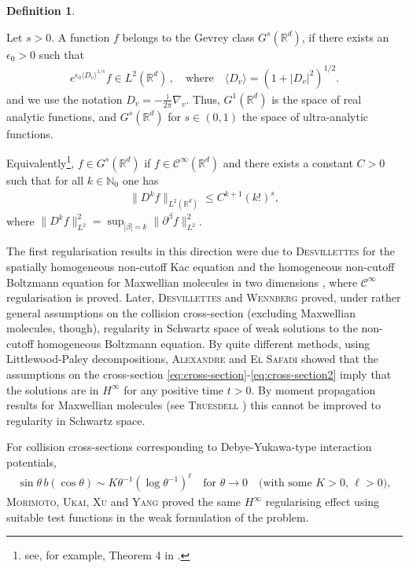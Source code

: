 \documentclass[11pt,a4paper,reqno]{amsart}
\theoremstyle{plain}
\theoremstyle{definition}
\newtheorem{definition}[proposition]{Definition}
\begin{document}
\begin{definition}\label{def:Gevrey}

	Let $s>0$. A function $f$ belongs to the Gevrey class $G^s({\mathbb{R}}^d)$, 	
	if there exists an $\epsilon_0>0$ such that
	\begin{align*}
		e^{\epsilon_0 \langle D_v \rangle^{1/s}} f \in L^2({\mathbb{R}}^d)\,, \quad  \text{where} \quad \langle D_v \rangle = \left(1+ |D_v|^2 \right)^{1/2}.
	\end{align*}
	and we use the notation $D_v=-\frac{\mathrm{i}}{2\pi} \nabla_v$. Thus, $G^1({\mathbb{R}}^d)$ is the space of real analytic functions, and $G^s({\mathbb{R}}^d)$ for $s\in(0,1)$ the space of ultra-analytic functions.
	
	Equivalently\footnote{see, for example, Theorem 4 in \cite{LO97}.}, $f\in G^s({\mathbb{R}}^d)$ if
	$f\in \mathcal{C}^{\infty}({\mathbb{R}}^d)$ and there exists a constant $C>0$ such that for all $k\in{\mathbb{N}}_0$ one has
	\begin{align*}
		\| D^k f\|_{L^2({\mathbb{R}}^d)} \leq C^{k+1} (k!)^s,
	\end{align*}
	where $\| D^k f\|_{L^2}^2 = \sup_{|\beta|=k} \| \partial^{\beta} f\|_{L^2}^2$.
\end{definition}

The first regularisation results in this direction were due to \textsc{Desvillettes} for the spatially homogeneous non-cutoff Kac equation \cite{Des95} and the homogeneous non-cutoff Boltzmann equation for Maxwellian molecules in two dimensions \cite{Des97}, where $\mathcal{C}^{\infty}$ regularisation is proved. Later,
\textsc{Desvillettes} and \textsc{Wennberg} \cite{DW10} proved, under rather general assumptions on the collision cross-section (excluding Maxwellian molecules, though), regularity in Schwartz space of weak solutions to the non-cutoff homogeneous Boltzmann equation.
By quite different methods, using Littlewood-Paley decompositions, \textsc{Alexandre} and \textsc{El Safadi} \cite{AE05} showed that the assumptions on the cross-section \eqref{eq:cross-section}-\eqref{eq:cross-section2} imply that the solutions are in $H^{\infty}$ for any positive time $t>0$. By moment propagation results for Maxwellian molecules (see \textsc{Truesdell} \cite{Tru56}) this cannot be improved to regularity in Schwartz space.

 For collision cross-sections corresponding to Debye-Yukawa-type interaction potentials,
 \begin{align*}
 	\sin\theta\,b(\cos\theta) \sim K \theta^{-1}(\log\theta^{-1})^{\ell} \quad  \text{for } \theta\to0 \quad \text{(with some } K>0,\, \ell>0\text{)},
 	\end{align*}
 \textsc{Morimoto, Ukai, Xu} and \textsc{Yang} \cite{MUXY09} proved the same $H^{\infty}$ regularising effect using suitable test functions in the weak formulation of the problem.
\end{document}
